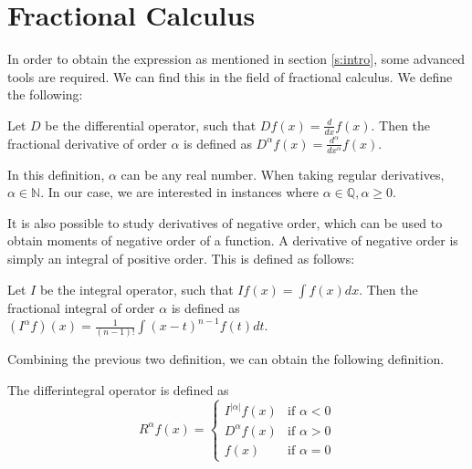\section{Fractional Calculus}\label{s:calculus}
In order to obtain the expression as mentioned in section \ref{s:intro}, some advanced tools are required. We can find this in the field of fractional calculus.
We define the following:
\begin{definition}
    Let \(D\) be the differential operator, such that \(D f(x) = \frac{d}{dx} f(x)\). Then the fractional derivative of order \(\alpha\) is defined as \(D^{\alpha} f(x) = \frac{d^{\alpha}}{dx^{\alpha}} f(x)\).
\end{definition}
In this definition, \(\alpha\) can be any real number. When taking regular derivatives, \(\alpha \in \mathbb{N}\). In our case, we are interested in instances where  \(\alpha \in \mathbb{Q}, \alpha \geq 0\).

It is also possible to study derivatives of negative order, which can be used to obtain moments of negative order of a function. A derivative of negative order is simply an integral of positive order. This is defined as follows:
\begin{definition}
    Let \(I\) be the integral operator, such that \(I f(x) = \int f(x) dx\). Then the fractional integral of order \(\alpha\) is defined as \((I^{\alpha} f) (x) = \frac{1}{(n-1)!}\int (x-t)^{n-1} f(t) dt\).
\end{definition}

Combining the previous two definition, we can obtain the following definition.
\begin{definition}\label{d: differintegral}
    The differintegral operator is defined as
    \begin{equation}
        R^\alpha f(x) = \begin{cases}
            I^{|\alpha|} f(x) & \text{if } \alpha < 0 \\
            D^\alpha f(x) & \text{if } \alpha > 0 \\
            f(x) & \text{if } \alpha = 0
        \end{cases}
        \end{equation}
\end{definition}

